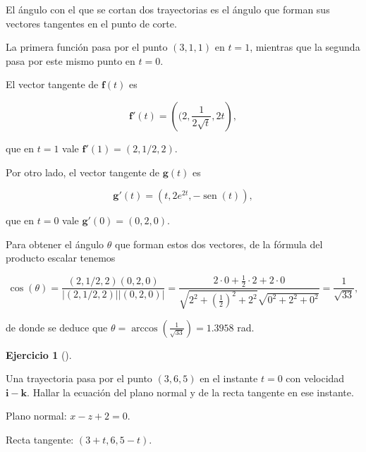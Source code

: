 \documentclass[
  spanish,
  a4paper,
]{scrreport}
\theoremstyle{definition}
\newtheorem{exercise}{Ejercicio}[chapter]
\theoremstyle{remark}
\begin{document}
\begin{tcolorbox}[enhanced jigsaw, arc=.35mm, bottomrule=.15mm, bottomtitle=1mm, breakable, colback=white, colbacktitle=quarto-callout-tip-color!10!white, colframe=quarto-callout-tip-color-frame, coltitle=black, left=2mm, leftrule=.75mm, opacityback=0, opacitybacktitle=0.6, rightrule=.15mm, title=\textcolor{quarto-callout-tip-color}{\faLightbulb}\hspace{0.5em}{Solución}, titlerule=0mm, toprule=.15mm, toptitle=1mm]

El ángulo con el que se cortan dos trayectorias es el ángulo que forman
sus vectores tangentes en el punto de corte.

La primera función pasa por el punto \((3,1,1)\) en \(t=1\), mientras
que la segunda pasa por este mismo punto en \(t=0\).

El vector tangente de \(\mathbf{f}(t)\) es

\[
\mathbf{f}'(t) = \left((2, \frac{1}{2\sqrt{t}}, 2t\right),
\]

que en \(t=1\) vale \(\mathbf{f}'(1) = (2,1/2,2)\).

Por otro lado, el vector tangente de \(\mathbf{g}(t)\) es

\[
\mathbf{g}'(t) = (t, 2e^{2t}, -\operatorname{sen}(t)),
\]

que en \(t=0\) vale \(\mathbf{g}'(0) = (0,2,0)\).

Para obtener el ángulo \(\theta\) que forman estos dos vectores, de la
fórmula del producto escalar tenemos

\[
\cos(\theta) 
= \frac{(2,1/2,2)(0,2,0)}{|(2,1/2,2)||(0,2,0)|}
= \frac{2\cdot 0+\frac{1}{2}\cdot 2+2\cdot 0}{\sqrt{2^2+\left(\frac{1}{2}\right)^2+2^2}\sqrt{0^2+2^2+0^2}}
= \frac{1}{\sqrt{33}},
\]

de donde se deduce que
\(\theta = \operatorname{arccos}(\frac{1}{\sqrt{33}}) = 1.3958\) rad.

\end{tcolorbox}

\begin{exercise}[]\protect\hypertarget{exr-plano-normal-trayectoria}{}\label{exr-plano-normal-trayectoria}

Una trayectoria pasa por el punto \((3,6,5)\) en el instante \(t=0\) con
velocidad \(\mathbf{i}-\mathbf{k}\). Hallar la ecuación del plano normal
y de la recta tangente en ese instante.

\end{exercise}

\begin{tcolorbox}[enhanced jigsaw, arc=.35mm, bottomrule=.15mm, bottomtitle=1mm, breakable, colback=white, colbacktitle=quarto-callout-tip-color!10!white, colframe=quarto-callout-tip-color-frame, coltitle=black, left=2mm, leftrule=.75mm, opacityback=0, opacitybacktitle=0.6, rightrule=.15mm, title=\textcolor{quarto-callout-tip-color}{\faLightbulb}\hspace{0.5em}{Solución}, titlerule=0mm, toprule=.15mm, toptitle=1mm]

Plano normal: \(x-z+2=0\).

Recta tangente: \((3+t,6,5-t)\).

\end{tcolorbox}
\end{document}

